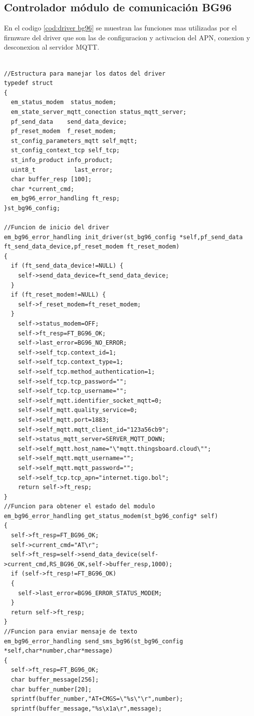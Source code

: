 \subsection{ Controlador módulo de comunicación BG96 } 
En el codigo \ref{cod:driver bg96} se muestran las funciones mas utilizadas por el firmware del driver que son las de configuracion y activacion del APN, conexion y desconexion al servidor MQTT.

\begin{lstlisting}[label=cod:driver bg96,caption=Funciones principales del driver del sensor AHT10.]  % Start your code-block

//Estructura para manejar los datos del driver 
typedef struct 
{
  em_status_modem  status_modem;
  em_state_server_mqtt_conection status_mqtt_server;
  pf_send_data    send_data_device;
  pf_reset_modem  f_reset_modem; 
  st_config_parameters_mqtt self_mqtt;
  st_config_context_tcp self_tcp;
  st_info_product info_product;
  uint8_t           last_error;
  char buffer_resp [100];
  char *current_cmd;
  em_bg96_error_handling ft_resp;
}st_bg96_config;

//Funcion de inicio del driver 
em_bg96_error_handling init_driver(st_bg96_config *self,pf_send_data ft_send_data_device,pf_reset_modem ft_reset_modem)
{
  if (ft_send_data_device!=NULL) {
    self->send_data_device=ft_send_data_device;
  }
  if (ft_reset_modem!=NULL) {
    self->f_reset_modem=ft_reset_modem;
  }
    self->status_modem=OFF;
    self->ft_resp=FT_BG96_OK;
    self->last_error=BG96_NO_ERROR;
    self->self_tcp.context_id=1;
    self->self_tcp.context_type=1;
    self->self_tcp.method_authentication=1;
    self->self_tcp.tcp_password="";
    self->self_tcp.tcp_username="";
    self->self_mqtt.identifier_socket_mqtt=0;
    self->self_mqtt.quality_service=0;
    self->self_mqtt.port=1883;
    self->self_mqtt.mqtt_client_id="123a56cb9";
    self->status_mqtt_server=SERVER_MQTT_DOWN;
    self->self_mqtt.host_name="\"mqtt.thingsboard.cloud\"";
    self->self_mqtt.mqtt_username="";
    self->self_mqtt.mqtt_password="";
    self->self_tcp.tcp_apn="internet.tigo.bol";
    return self->ft_resp;
}
//Funcion para obtener el estado del modulo
em_bg96_error_handling get_status_modem(st_bg96_config* self)
{
  self->ft_resp=FT_BG96_OK;
  self->current_cmd="AT\r";
  self->ft_resp=self->send_data_device(self->current_cmd,RS_BG96_OK,self->buffer_resp,1000);
  if (self->ft_resp!=FT_BG96_OK)
  {
    self->last_error=BG96_ERROR_STATUS_MODEM;
  }
  return self->ft_resp;
}
//Funcion para enviar mensaje de texto 
em_bg96_error_handling send_sms_bg96(st_bg96_config *self,char*number,char*message)
{
  self->ft_resp=FT_BG96_OK;
  char buffer_message[256];
  char buffer_number[20];
  sprintf(buffer_number,"AT+CMGS=\"%s\"\r",number);
  sprintf(buffer_message,"%s\x1a\r",message);
  

\end{lstlisting}
